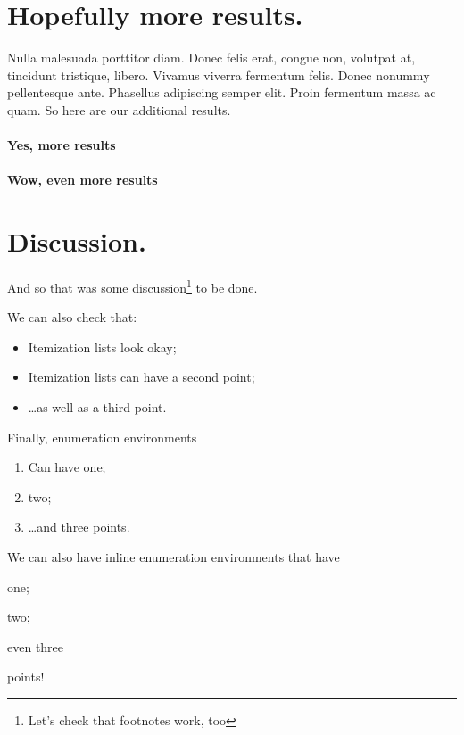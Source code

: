 \documentclass[
    papertype=a4paper,
]{phfextendedabstract}
\begin{document}
\lipsum[5]


\section{Hopefully more results.}
Nulla malesuada porttitor diam. Donec felis erat, congue non, volutpat at,
tincidunt tristique, libero. Vivamus viverra fermentum felis. Donec nonummy
pellentesque ante. Phasellus adipiscing semper elit. Proin fermentum massa ac
quam.   So here are our additional results.

\paragraph{Yes, more results}
\lipsum[6]

\paragraph{Wow, even more results}
\lipsum[7-9]

\section{Discussion.}
\lipsum[8]

And so that was some discussion\footnote{Let's check that footnotes work, too} to be done.

We can also check that:
\begin{itemize}
\item Itemization lists look okay;
\item Itemization lists can have a second point;
\item \ldots as well as a third point.
\end{itemize}

Finally, enumeration environments
\begin{enumerate}
\item Can have one;
\item two;
\item \ldots and three points.
\end{enumerate}

We can also have inline enumeration environments that have
\begin{enumerate*}[label=\textbf{(\roman*)},itemjoin*={{ \ldots\ and }}]
\item one;
\item two;
\item even three
\end{enumerate*}
points!
\end{document}
